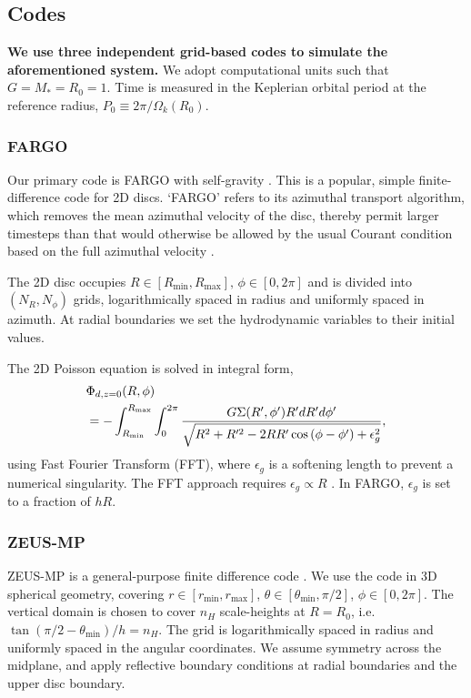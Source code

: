 \subsection{Codes}
{\bf We use three independent grid-based codes to simulate the aforementioned
system.} We adopt computational units such that
$G=M_*=R_0=1$. Time is measured  in the Keplerian orbital period at
the reference radius, $P_0\equiv  2\pi/\Omega_k(R_0)$.   

\subsubsection{FARGO}
Our primary code is FARGO with self-gravity \citep{baruteau08}. This
is a popular, simple finite-difference code for 2D discs. `FARGO' refers
to its azimuthal transport algorithm, which removes the mean azimuthal
velocity of the disc, thereby permit larger timesteps than that would otherwise be allowed
by the usual Courant condition based on the full azimuthal
velocity \citep{masset00a,masset00b}.     

The 2D disc occupies
$R\in[R_\mathrm{min},R_\mathrm{max}],\,\phi\in[0,2\pi]$ and is  
divided into $(N_R,N_\phi)$ grids, logarithmically spaced in radius and
uniformly spaced in azimuth. At radial boundaries we set the
hydrodynamic variables to their initial values.   

The 2D Poisson equation is solved in integral form, 
\begin{align}\label{2d_grav}
  &\Phi_{d,z=0}(R,\phi) \notag \\
  &=-\int_{R_\mathrm{min}}^{R_\mathrm{max}} \int_0^{2\pi}
  \frac{G\Sigma(R^\prime,\phi^\prime)R^\prime dR^\prime d\phi^\prime}{\sqrt{R^2+R^{\prime 2} -
      2RR^\prime\cos{(\phi - \phi^\prime)} + \epsilon_g^2}}, 
\end{align}
using Fast Fourier Transform (FFT), where $\epsilon_g$ is a softening
length to prevent a numerical singularity. The FFT approach requires
$\epsilon_g\propto R$ \citep{baruteau08}. In FARGO, $\epsilon_g$ is
set to a fraction of $hR$.  

\subsubsection{ZEUS-MP}
ZEUS-MP  is a general-purpose finite difference
code \citep{hayes06}. We use the code in 3D spherical geometry, covering
$r\in[r_\mathrm{min},r_\mathrm{max}]$, $\theta\in[\theta_\mathrm{min},\pi/2]$,
$\phi\in[0,2\pi]$. The vertical domain is chosen to cover $n_H$
scale-heights at $R=R_0$, i.e. $\tan{(\pi/2 - \theta_\mathrm{min})}/h=n_H$. 
The grid is logarithmically spaced in radius and uniformly spaced in the angular
coordinates. We assume symmetry across the midplane, and
apply reflective boundary conditions at radial boundaries and the
upper disc boundary.  

